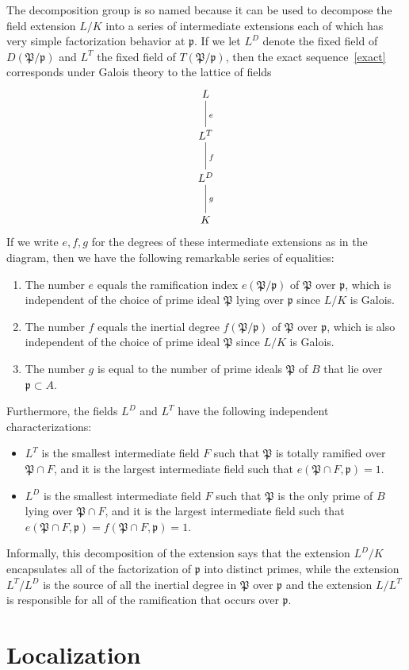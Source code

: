 \documentclass[12pt]{article}
\newcommand{\p}{{\mathfrak{p}}}
\renewcommand{\P}{{\mathfrak{P}}}
\begin{document}
The decomposition group is so named because it can be used to
decompose the field extension $L/K$ into a series of intermediate
extensions each of which has very simple factorization behavior at
$\p$. If we let $L^D$ denote the fixed field of $D(\P/\p)$ and $L^T$
the fixed field of $T(\P/\p)$, then the exact sequence~\eqref{exact}
corresponds under Galois theory to the lattice of fields
$$
\xymatrix{
L \ar@{-}[d]^e \\
L^T \ar@{-}[d]^f \\
L^D \ar@{-}[d]^g \\
K
}
$$
If we write $e,f,g$ for the degrees of these intermediate extensions
as in the diagram, then we have the following remarkable series of
equalities:
\begin{enumerate}
\item The number $e$ equals the ramification index $e(\P/\p)$ of $\P$
  over $\p$, which is independent of the choice of prime ideal $\P$
  lying over $\p$ since $L/K$ is Galois.
\item The number $f$ equals the inertial degree $f(\P/\p)$ of $\P$
  over $\p$, which is also independent of the choice of prime ideal $\P$
  since $L/K$ is Galois.
\item The number $g$ is equal to the number of prime ideals $\P$ of
  $B$ that lie over $\p \subset A$.
\end{enumerate}

Furthermore, the fields $L^D$ and $L^T$ have the following independent
characterizations:
\begin{itemize}
\item $L^T$ is the smallest intermediate field $F$ such that $\P$ is
  totally ramified over $\P \cap F$, and it is the largest
  intermediate field such that $e(\P \cap F, \p) = 1$.
\item $L^D$ is the smallest intermediate field $F$ such that $\P$ is
  the only prime of $B$ lying over $\P \cap F$, and it is the largest
  intermediate field such that $e(\P \cap F, \p) = f(\P \cap F, \p) =
  1$.
\end{itemize}

Informally, this decomposition of the extension says that the
extension $L^D/K$ encapsulates all of the factorization of $\p$ into
distinct primes, while the extension $L^T/L^D$ is the source of all
the inertial degree in $\P$ over $\p$ and the extension $L/L^T$ is
responsible for all of the ramification that occurs over $\p$.

\section{Localization}
\end{document}
